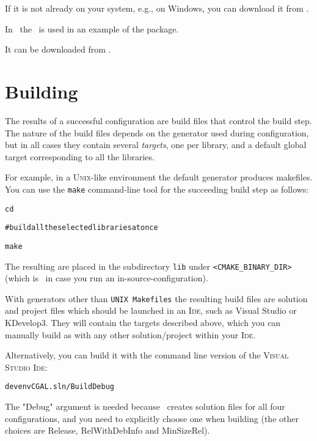 If it is not already on your system,
e.g., on Windows, you can download it from  \zlibpage.

In \cgal\ the  \esbtl\ is used in an example of the 
 package.

It can be downloaded from \esbtlpage.

\section{Building \cgal \label{sec:building}}

The results of a successful configuration are build files that control the build step.
The nature of the build files depends on the generator used during configuration, but in all cases they 
contain several \emph{targets}, one per library, and a default global target corresponding 
to all the libraries.

For example, in a \textsc{Unix}-like environment the default generator produces
makefiles. You can use the \texttt{make} command-line tool for the
succeeding build step as follows:

{\ccTexHtml{}{}
\begin{alltt}

cd \cgalrel

# build all the selected libraries at once

make 

\end{alltt}
}

The resulting are placed in the subdirectory \texttt{lib} under \texttt{<CMAKE\_BINARY\_DIR>}
(which is \cgalrel\ in case you run an in-source-configuration).

With generators other than \texttt{UNIX Makefiles} the resulting build files
are solution and project files which
should be launched in an \textsc{Ide}, such as Visual Studio or KDevelop3. They will contain the targets described
above, which you can manually build as with any other solution/project within your \textsc{Ide}.

Alternatively, you can build it with the command line version of the
\textsc{Visual Studio Ide}:

{\ccTexHtml{}{}
\begin{alltt}

    devenv CGAL.sln /Build Debug

\end{alltt}
}

The "Debug" argument is needed because \cmake\ creates solution files for
all four configurations, and you need to explicitly choose one when building
(the other choices are Release, RelWithDebInfo and MinSizeRel).


